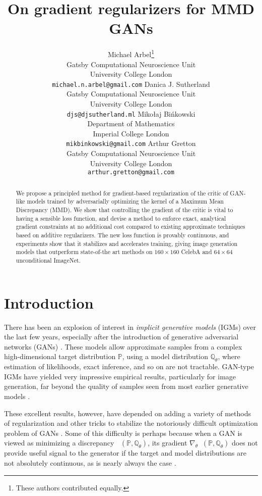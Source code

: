 \documentclass{article}
\title{On gradient regularizers for MMD GANs}
\author{
  Michael Arbel\thanks{These authors contributed equally.\vspace*{-5mm}}\\
  Gatsby Computational Neuroscience Unit\\University College London\\
  \texttt{michael.n.arbel@gmail.com}
  \And
  Danica J. Sutherland\footnotemark[1]\\
  Gatsby Computational Neuroscience Unit\\University College London\\
  \texttt{djs@djsutherland.ml}
  \And
  Miko{\l}aj Bi\'nkowski\\
  \phantom{xxxxx}Department of Mathematics\phantom{xxxxx}\\Imperial College London\\
  \texttt{mikbinkowski@gmail.com}
  \vspace*{-5mm}
  \And
  Arthur Gretton\\
  Gatsby Computational Neuroscience Unit\\University College London\\
  \texttt{arthur.gretton@gmail.com}
  \vspace*{-5mm}
}
\DeclareMathOperator{\D}{\mathcal D}
\newcommand{\PP}{\mathbb P}
\newcommand{\QQ}{\mathbb Q}
\DeclareMathOperator{\DGAN}{\D_{GAN}}
\begin{document}
\maketitle

\begin{abstract}
We propose a principled method for gradient-based regularization of the critic of GAN-like models trained by adversarially optimizing the kernel of a Maximum Mean Discrepancy (MMD).
We show that controlling the gradient of the critic is vital to having a sensible loss function,
and devise a method to enforce exact, analytical gradient constraints
at no additional cost compared to existing approximate techniques based on additive regularizers.
The new loss function is provably continuous,
and experiments show that it stabilizes and accelerates training,
giving image generation models that outperform state-of-the art methods
on $160 \times 160$ CelebA and $64 \times 64$ unconditional ImageNet.
\end{abstract}

\section{Introduction}



There has been an explosion of interest in \emph{implicit generative models} (IGMs) over the last few years,
especially after the introduction of generative adversarial networks (GANs) \parencite{gans}.
These models allow approximate samples from a complex high-dimensional target distribution $\PP$,
using a model distribution $\QQ_\theta$, where estimation of likelihoods, exact inference, and so on are not tractable.
GAN-type IGMs have yielded very impressive empirical results,
particularly for image generation,
far beyond the quality of samples seen from most earlier generative models \parencite[e.g.][]{progressive-growing,dcgan,wgan-gp,munit,anime-gans}.

These excellent results, however, have depended on adding a variety of methods of regularization and other tricks to stabilize the notoriously difficult optimization problem of GANs \parencite{improved-gans,dcgan}.
Some of this difficulty is perhaps because
when a GAN is viewed as minimizing a discrepancy $\DGAN(\PP, \QQ_\theta)$,
its gradient
$\nabla_\theta \DGAN(\PP, \QQ_\theta)$
does not provide useful signal to the generator
if the target and model distributions are not absolutely continuous,
as is nearly always the case \parencite{towards-principled-gans}.
\end{document}
